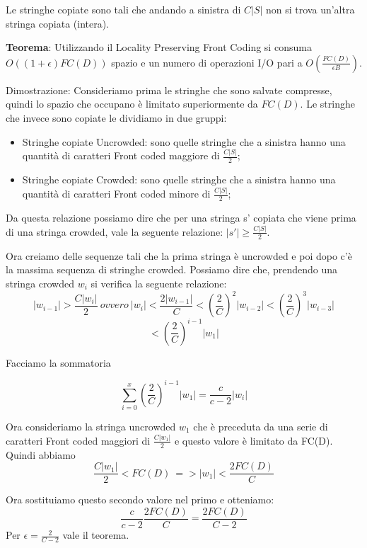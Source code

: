 \documentclass[14pt]{extreport}
\begin{document}
Le stringhe copiate sono tali che andando a sinistra di $C|S|$ non si trova un'altra stringa copiata (intera).

\textbf{Teorema}: Utilizzando il Locality Preserving Front Coding si consuma $O((1+\epsilon)FC(D))$ spazio e un numero di operazioni I/O pari a $O(\frac{FC(D)}{\epsilon B})$.

Dimostrazione: Consideriamo prima le stringhe che sono salvate compresse, quindi lo spazio che occupano è limitato superiormente da $FC(D)$. Le stringhe che invece sono copiate le dividiamo in due gruppi:
\begin{itemize}
\item Stringhe copiate Uncrowded: sono quelle stringhe che a sinistra hanno una quantità di caratteri Front coded maggiore di $\frac{C|S|}{2}$;
\item Stringhe copiate Crowded: sono quelle stringhe che a sinistra hanno una quantità di caratteri Front coded minore di $\frac{C|S|}{2}$;
\end{itemize}

Da questa relazione possiamo dire che per una stringa s' copiata che viene prima di una stringa crowded, vale la seguente relazione: $|s'| \geq \frac{C|S|}{2}$.

Ora creiamo delle sequenze tali che la prima stringa è uncrowded e poi dopo c'è la massima sequenza di stringhe crowded. 
Possiamo dire che, prendendo una stringa crowded $w_i$ si verifica la seguente relazione:
\begin{equation}
|w_{i-1}| > \frac{C|w_i|}{2} \ ovvero \ |w_{i}| < \frac{2|w_{i-1}|}{C} < (\frac{2}{C})^2|w_{i-2}| < (\frac{2}{C})^3|w_{i-3}|
\end{equation}
\begin{equation}
< (\frac{2}{C})^{i-1}|w_{1}|
\end{equation} 

Facciamo la sommatoria

\begin{equation}
\sum_{i=0}^x  (\frac{2}{C})^{i-1}|w_{1}| = \frac{c}{c-2}|w_i|
\end{equation}

Ora consideriamo la stringa uncrowded $w_1$ che è preceduta da una serie di caratteri Front coded maggiori di $\frac{C|w_1|}{2}$ e questo valore è limitato da FC(D).
Quindi abbiamo
\begin{equation}
\frac{C|w_1|}{2} < FC(D) \ => |w_1| < \frac{2FC(D)}{C}
\end{equation}

Ora sostituiamo questo secondo valore nel primo e otteniamo:
\begin{equation}
\frac{c}{c-2}\frac{2FC(D)}{C} = \frac{2FC(D)}{C-2}
\end{equation}
Per $\epsilon = \frac{2}{C-2}$ vale il teorema.
\end{document}
